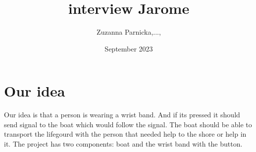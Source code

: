\documentclass{article}[10pt]
\title{interview Jarome}
\author{Zuzanna Parnicka,...,}
\date{September 2023}
\begin{document}
\renewcommand{\labelenumii}{\arabic{enumi}.\arabic{enumii}}
\renewcommand{\labelenumiii}{\arabic{enumi}.\arabic{enumii}.\arabic{enumiii}}
\renewcommand{\labelenumiv}{\arabic{enumi}.\arabic{enumii}.\arabic{enumiii}.\arabic{enumiv}}

\maketitle
\section{Our idea}
Our idea is that a person is wearing a wrist band. And if its pressed it should send signal to the boat which would follow the signal. 
The boat should be able to transport the lifegourd with the person that needed help to the shore or help in it. 
The project has two components: boat and the wrist band with the button. 
\end{document}
